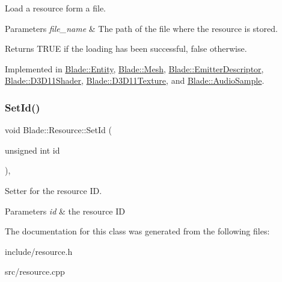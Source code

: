 Load a resource form a file. 


\begin{DoxyParams}{Parameters}
{\em file\+\_\+name} & The path of the file where the resource is stored. \\
\hline
\end{DoxyParams}
\begin{DoxyReturn}{Returns}
T\+R\+UE if the loading has been successful, false otherwise. 
\end{DoxyReturn}


Implemented in \hyperlink{class_blade_1_1_entity_a1e23e9402a5c5a1d266c208c7637c539}{Blade\+::\+Entity}, \hyperlink{class_blade_1_1_mesh_a999b87101e849d8a6618d95c69387ec1}{Blade\+::\+Mesh}, \hyperlink{struct_blade_1_1_emitter_descriptor_ac3bf4ccedee573630235f498a0c47822}{Blade\+::\+Emitter\+Descriptor}, \hyperlink{class_blade_1_1_d3_d11_shader_a713231594415a37d484f115478acf084}{Blade\+::\+D3\+D11\+Shader}, \hyperlink{class_blade_1_1_d3_d11_texture_ae9f6d01709ba9db4085cf6b3d90b3ac7}{Blade\+::\+D3\+D11\+Texture}, and \hyperlink{class_blade_1_1_audio_sample_a27bc4a11067251a2c820f1e3096bb812}{Blade\+::\+Audio\+Sample}.

\mbox{\label{class_blade_1_1_resource_a76912ec0d2dfb35a5fffc7364b8a867d}} 
\subsubsection{\texorpdfstring{Set\+Id()}{SetId()}}
{\footnotesize\ttfamily void Blade\+::\+Resource\+::\+Set\+Id (\begin{DoxyParamCaption}\item[{unsigned int}]{id }\end{DoxyParamCaption})\hspace{0.3cm}{\ttfamily [inline]}, {\ttfamily [noexcept]}}



Setter for the resource ID. 


\begin{DoxyParams}{Parameters}
{\em id} & the resource ID \\
\hline
\end{DoxyParams}


The documentation for this class was generated from the following files\+:\begin{DoxyCompactItemize}
\item 
include/resource.\+h\item 
src/resource.\+cpp\end{DoxyCompactItemize}
